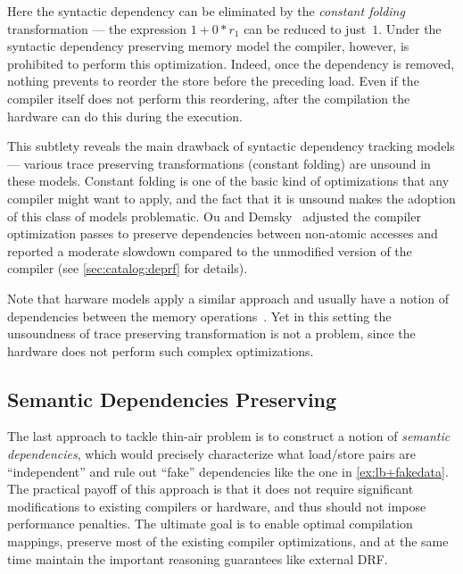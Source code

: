 Here the syntactic dependency can be eliminated 
by the \emph{constant folding} transformation --- 
the expression $1 + 0 * r_1$ can be reduced to just~$1$.
Under the syntactic dependency preserving memory model 
the compiler, however, is prohibited to perform this optimization. 
Indeed, once the dependency is removed, nothing prevents 
to reorder the store before the preceding load. 
Even if the compiler itself does not perform this reordering,
after the compilation the hardware can do this during the execution.   

This subtlety reveals the main drawback of 
syntactic dependency tracking models --- 
various trace preserving transformations
(\eg constant folding) are unsound in these models. 
Constant folding is one of the basic kind of optimizations that 
any compiler might want to apply, 
and the fact that it is unsound  
makes the adoption of this class of models problematic.
Ou and Demsky~\cite{Ou-Demsky:OOPSLA18} adjusted 
the compiler optimization passes to preserve
dependencies between non-atomic accesses 
and reported a moderate slowdown compared 
to the unmodified version of the compiler  
(see \ref{sec:catalog:deprf} for details).

Note that harware models apply a similar approach 
and usually have a notion of dependencies between 
the memory operations~\cite{Sarkar-al:PLDI11, Alglave-al:TOPLAS14, Pulte-al:POPL18}.
Yet in this setting the unsoundness of 
trace preserving transformation is not a problem,
since the hardware does not perform such complex optimizations.

\subsection{Semantic Dependencies Preserving}
\label{sec:analysis:sdeprf}

The last approach to tackle thin-air problem is to   
construct a notion of \emph{semantic dependencies}, 
which would precisely characterize what load/store 
pairs are ``independent'' and rule out 
``fake'' dependencies like the one in \ref{ex:lb+fakedata}.
The practical payoff of this approach is that it 
does not require significant modifications to existing compilers or hardware, 
and thus should not impose performance penalties.  
The ultimate goal is to enable optimal compilation mappings, 
preserve most of the existing compiler optimizations, 
and at the same time maintain the important 
reasoning guarantees like external DRF. 

